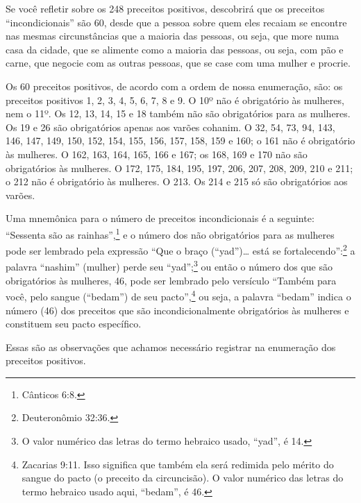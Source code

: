 \begin{multicols}{2}
Se você refletir sobre os 248 preceitos positivos, descobrirá que os
preceitos ``incondicionais'' são 60, desde que a pessoa sobre quem eles
recaiam se encontre nas mesmas circunstâncias que a maioria das pessoas,
ou seja, que more numa casa da cidade, que se alimente como a maioria
das pessoas, ou seja, com pão e carne, que negocie com as outras
pessoas, que se case com uma mulher e procrie.

Os 60 preceitos positivos, de acordo com a ordem de nossa enumeração,
são: os preceitos positivos 1, 2, 3, 4, 5, 6, 7, 8 e 9. O 10º não é
obrigatório às mulheres, nem o 11º. Os 12, 13, 14, 15 e 18 também não
são obrigatórios para as mulheres. Os 19 e 26 são obrigatórios apenas
aos varões cohanim\starr. O 32, 54, 73, 94, 143, 146, 147, 149, 150, 152,
154, 155, 156, 157, 158, 159 e 160; o 161 não é obrigatório às mulheres.
O 162, 163, 164, 165, 166 e 167; os 168, 169 e 170 não são obrigatórios
às mulheres. O 172, 175, 184, 195, 197, 206, 207, 208, 209, 210 e 211; o
212 não é obrigatório às mulheres. O 213. Os 214 e 215 só são
obrigatórios aos varões.

Uma mnemônica para o número de preceitos incondicionais é a seguinte: ``Sessenta são as rainhas'',\footnote{Cânticos 6:8.} e o número dos não obrigatórios para as mulheres pode ser lembrado pela expressão ``Que o braço (``yad'')\ldots{} está se fortalecendo'':\footnote{Deuteronômio 32:36.} a palavra ``nashim'' (mulher)
perde seu ``yad'';\footnote{O valor numérico das letras do termo hebraico usado, ``yad'', é 14.} ou então o número dos que são
obrigatórios às mulheres, 46, pode ser lembrado pelo versículo ``Também para você, pelo sangue (``bedam'') de seu pacto'',\footnote{Zacarias 9:11. Isso significa que também ela será redimida pelo mérito do sangue do
  pacto (o preceito da circuncisão). O valor numérico das letras do
  termo hebraico usado aqui, ``bedam'', é 46.} ou seja, a
palavra ``bedam'' indica o número (46) dos preceitos que são incondicionalmente obrigatórios às mulheres e constituem seu pacto específico.

Essas são as observações que achamos necessário registrar na enumeração
dos preceitos positivos.
\end{multicols}
